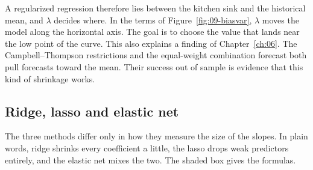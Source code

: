 A regularized regression therefore lies between the kitchen sink and the historical mean, and $\lambda$ decides where. In the terms of Figure~\ref{fig:09-biasvar}, $\lambda$ moves the model along the horizontal axis. The goal is to choose the value that lands near the low point of the curve. This also explains a finding of Chapter~\ref{ch:06}. The Campbell--Thompson restrictions and the equal-weight combination forecast both pull forecasts toward the mean. Their success out of sample is evidence that this kind of shrinkage works.

\subsection{Ridge, lasso and elastic net}

The three methods differ only in how they measure the size of the slopes. In plain words, ridge shrinks every coefficient a little, the lasso drops weak predictors entirely, and the elastic net mixes the two. The shaded box gives the formulas.

